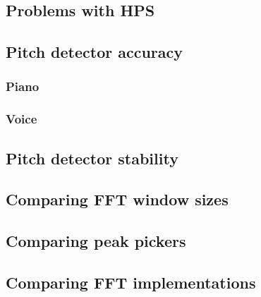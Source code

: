 \subsection{Problems with HPS}

\subsection{Pitch detector accuracy}
\subsubsection{Piano}
\subsubsection{Voice}
\subsection{Pitch detector stability}
\subsection{Comparing FFT window sizes}
\subsection{Comparing peak pickers}
\subsection{Comparing FFT implementations}